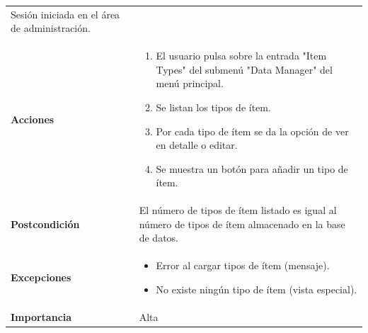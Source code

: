 \documentclass[
]{article}
\providecommand{\tightlist}{%
  \setlength{\itemsep}{0pt}\setlength{\parskip}{0pt}}
\begin{document}
\begin{longtable}[]{@{}ll@{}}
\begin{minipage}[t]{0.75\columnwidth}
Sesión iniciada en el área de administración.\strut
\end{minipage}\tabularnewline
\begin{minipage}[t]{0.19\columnwidth}\raggedright
\textbf{Acciones}\strut
\end{minipage} & \begin{minipage}[t]{0.75\columnwidth}\raggedright
\begin{enumerate}
\def\labelenumi{\arabic{enumi}.}
\tightlist
\item
  El usuario pulsa sobre la entrada "Item Types" del submenú "Data
  Manager" del menú principal.
\item
  Se listan los tipos de ítem.
\item
  Por cada tipo de ítem se da la opción de ver en detalle o editar.
\item
  Se muestra un botón para añadir un tipo de ítem.
\end{enumerate}\strut
\end{minipage}\tabularnewline
\begin{minipage}[t]{0.19\columnwidth}\raggedright
\textbf{Postcondición}\strut
\end{minipage} & \begin{minipage}[t]{0.75\columnwidth}\raggedright
El número de tipos de ítem listado es igual al número de tipos de ítem
almacenado en la base de datos.\strut
\end{minipage}\tabularnewline
\begin{minipage}[t]{0.19\columnwidth}\raggedright
\textbf{Excepciones}\strut
\end{minipage} & \begin{minipage}[t]{0.75\columnwidth}\raggedright
\begin{itemize}
\tightlist
\item
  Error al cargar tipos de ítem (mensaje).
\item
  No existe ningún tipo de ítem (vista especial).
\end{itemize}\strut
\end{minipage}\tabularnewline
\begin{minipage}[t]{0.19\columnwidth}\raggedright
\textbf{Importancia}\strut
\end{minipage} & \begin{minipage}[t]{0.75\columnwidth}\raggedright
Alta\strut
\end{minipage}\tabularnewline
\bottomrule
\end{longtable}
\end{document}
